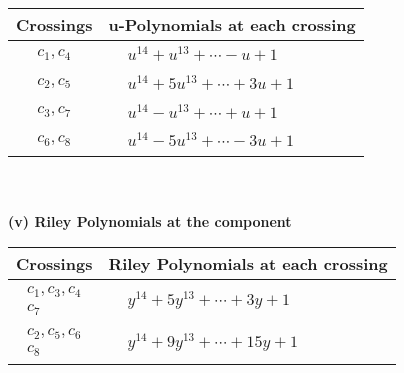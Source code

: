 \documentclass[1p]{elsarticle_modified}
\theoremstyle{definition}
\begin{document}
\begin{tabular}{m{50pt}|m{274pt}}
Crossings & \hspace{64pt}u-Polynomials at each crossing \\
\hline $$\begin{aligned}c_{1},c_{4}\end{aligned}$$&$\begin{aligned}
&u^{14}+u^{13}+\cdots- u+1
\end{aligned}$\\
\hline $$\begin{aligned}c_{2},c_{5}\end{aligned}$$&$\begin{aligned}
&u^{14}+5 u^{13}+\cdots+3 u+1
\end{aligned}$\\
\hline $$\begin{aligned}c_{3},c_{7}\end{aligned}$$&$\begin{aligned}
&u^{14}- u^{13}+\cdots+u+1
\end{aligned}$\\
\hline $$\begin{aligned}c_{6},c_{8}\end{aligned}$$&$\begin{aligned}
&u^{14}-5 u^{13}+\cdots-3 u+1
\end{aligned}$\\
\hline
\end{tabular}\\~\\
\newpage\renewcommand{\arraystretch}{1}
\flushleft \textbf{(v) Riley Polynomials at the component}\newline \\
\begin{tabular}{m{50pt}|m{274pt}}
Crossings & \hspace{64pt}Riley Polynomials at each crossing \\
\hline $$\begin{aligned}c_{1},c_{3},c_{4}\\c_{7}\end{aligned}$$&$\begin{aligned}
&y^{14}+5 y^{13}+\cdots+3 y+1
\end{aligned}$\\
\hline $$\begin{aligned}c_{2},c_{5},c_{6}\\c_{8}\end{aligned}$$&$\begin{aligned}
&y^{14}+9 y^{13}+\cdots+15 y+1
\end{aligned}$\\
\hline
\end{tabular}\\~\\
\end{document}
